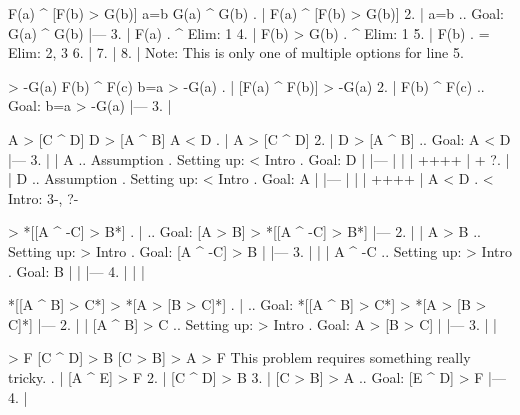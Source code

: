 \argument
 F(a) ^ [F(b) > G(b)]
 a=b
\argumentline
 G(a) ^ G(b)
\endargument
	\answer
	. | F(a) ^ [F(b) > G(b)]
	 2. | a=b          ..  Goal: G(a) ^ G(b)
	    |---
	 3. | F(a)         .  ^ Elim: 1
	 4. | F(b) > G(b)  .  ^ Elim: 1
	 5. | F(b)         .  = Elim: 2, 3
	 6. | 
	 7. | 
	 8. | 
	\endfitchproof
	\endanswer
Note: This is only one of multiple options for line 5.

\argument
 [F(a) ^ F(b)] > -G(a)
 F(b) ^ F(c)
\argumentline
 b=a > -G(a)
\endargument
	\answer
	. | [F(a) ^ F(b)] > -G(a)
	 2. | F(b) ^ F(c)    ..  Goal: b=a > -G(a)
	    |---
	 3. | 
	\endfitchproof
	\endanswer

\argument
 A > [C ^ D]
 D > [A ^ B]
\argumentline
 A < D
\endargument
	\answer
	. | A > [C ^ D]
	 2. | D > [A ^ B]   ..  Goal: A < D
	    |---
	 3. |  | A          ..  Assumption  .  Setting up: < Intro  .  Goal: D
	    |  |---
	    |  | 
	    |  ++++
	    |  +
	 ?. |  | D          ..  Assumption  .  Setting up: < Intro  .  Goal: A
	    |  |---
	    |  | 
	    |  ++++
	    | A < D         .  < Intro: 3-, ?-
	\endfitchproof
	\endanswer

\argument
\argumentline
 [A > B] > *[[A ^ -C] > B*]
\endargument
	\answer
	. |               ..  Goal: [A > B] > *[[A ^ -C] > B*]
	    |---
	 2. |  | A > B      ..  Setting up: > Intro  .  Goal: [A ^ -C] > B
	    |  |---
	 3. |  |  | A ^ -C  ..  Setting up: > Intro  .  Goal: B
	    |  |  |---
	 4. |  |  | 
	\endfitchproof
	\endanswer

\argument
\argumentline
 *[[A ^ B] > C*] > *[A > [B > C]*]
\endargument
	\answer
	. |                 ..  Goal: *[[A ^ B] > C*] > *[A > [B > C]*]
	    |---
	 2. |  | [A ^ B] > C  ..  Setting up: > Intro  .  Goal: A > [B > C]
	    |  |---
	 3. |  | 
	\endfitchproof
	\endanswer

\argument
 [A ^ E] > F
 [C ^ D] > B
 [C > B] > A
\argumentline
 [E ^ D] > F
\endargument
\Hint This problem requires something really tricky.
	\answer
	. | [A ^ E] > F
	 2. | [C ^ D] > B
	 3. | [C > B] > A  ..  Goal: [E ^ D] > F
	    |---
	 4. | 
	\endfitchproof
	\endanswer

\endproblems
\bye
